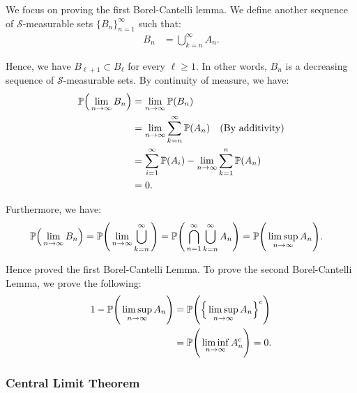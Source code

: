 \begin{proof*}
    We focus on proving the first Borel-Cantelli lemma. We define another sequence of $\mathcal{S}$-measurable sets $\{B_n\}_{n=1}^\infty$ such that:
    \begin{align*}
        B_n &= \bigcup_{k=n}^\infty A_n.
    \end{align*}

    \noindent Hence, we have $B_{\ell+1}\subset B_\ell$ for every $\ell\ge 1$. In other words, $B_n$ is a decreasing sequence of $\mathcal{S}$-measurable sets. By continuity of measure, we have:
    \begin{align*}
        \mathbb{P}\Big( \lim_{n\to\infty} B_n \Big) &= \lim_{n\to\infty} \mathbb{P}(B_n) \\
            &= \lim_{n\to\infty} \sum_{k=n}^\infty \mathbb{P}(A_n) \quad \text{(By additivity)} \\
            &= \sum_{i=1}^\infty\mathbb{P}(A_i) - \lim_{n\to\infty} \sum_{k=1}^n \mathbb{P}(A_n) \\
            &= 0.
    \end{align*}

    \noindent Furthermore, we have:
    \begin{align*}
        \mathbb{P}\Big( \lim_{n\to\infty} B_n \Big) &= \mathbb{P}\Bigg( \lim_{n\to\infty} \bigcup_{k=n}^\infty \Bigg) = \mathbb{P}\Bigg( \bigcap_{n=1}^\infty \bigcup_{k=n}^\infty A_n \Bigg) = \mathbb{P}\Bigg( \limsup_{n\to\infty} A_n \Bigg).
    \end{align*}

    \noindent Hence proved the first Borel-Cantelli Lemma. To prove the second Borel-Cantelli Lemma, we prove the following:
    \begin{align*}
        1 - \mathbb{P}\Bigg( \limsup_{n\to\infty} A_n \Bigg) &= \mathbb{P}\Bigg( \Big\{ \limsup_{n\to\infty} A_n \Big\}^c \Bigg) \\
        &= \mathbb{P}\Bigg( \liminf_{n\to\infty} A_n^c \Bigg) = 0.
    \end{align*}
\end{proof*}


\subsubsection{Central Limit Theorem}
